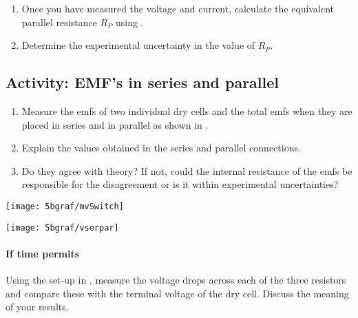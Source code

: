 \begin{multicols}{2}
\begin{enumerate}
	\item Once you have measured the voltage and current, calculate the equivalent parallel resistance $R_P$ using .
	
	\item Determine the experimental uncertainty in the value of $R_P$.
\end{enumerate}


\subsection{Activity: EMF's in series and parallel}
\begin{enumerate}
	\item Measure the emfs of two individual dry cells and the total emfs when they are placed in series and in parallel as shown in .
	
	\item Explain the values obtained in the series and parallel connections.
	
	\item Do they agree with theory?  If not, could the internal resistance of the emfs be responsible for the disagreement or is it within experimental uncertainties?
\end{enumerate}

%
%

\begin{center}
	\texttt{[image: 5bgraf/mvSwitch]}	%
	\label{f:mvSwitch}
\end{center}

\begin{center}
	\texttt{[image: 5bgraf/vserpar]} %
	\label{f:vseriespar} %
\end{center}


\paragraph{If time permits}  Using the set-up in , measure the voltage drops across each of the three resistors and compare these with the terminal voltage of the dry cell.  Discuss the meaning of your results.

\end{multicols}

